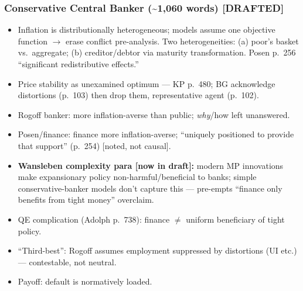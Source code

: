\documentclass[12pt,a4paper]{article}
\begin{document}
\begin{doublespace}
\subsubsection{Conservative Central Banker (\textasciitilde1,060 words) [DRAFTED]}
\begin{itemize}
    \item Inflation is distributionally heterogeneous; models assume one objective function $\rightarrow$ erase conflict pre-analysis. Two heterogeneities: (a) poor's basket vs.\ aggregate; (b) creditor/debtor via maturity transformation. Posen p.\ 256 ``significant redistributive effects.''
    \item Price stability as unexamined optimum --- KP p.\ 480; BG acknowledge distortions (p.\ 103) then drop them, representative agent (p.\ 102).
    \item Rogoff banker: more inflation-averse than public; \textit{why}/how left unanswered.
    \item Posen/finance: finance more inflation-averse; ``uniquely positioned to provide that support'' (p.\ 254) [noted, not causal].
    \item \textbf{Wansleben complexity para [now in draft]:} modern MP innovations make expansionary policy non-harmful/beneficial to banks; simple conservative-banker models don't capture this --- pre-empts ``finance only benefits from tight money'' overclaim.
    \item QE complication (Adolph p.\ 738): finance $\neq$ uniform beneficiary of tight policy.
    \item ``Third-best'': Rogoff assumes employment suppressed by distortions (UI etc.) --- contestable, not neutral.
    \item Payoff: default is normatively loaded.
\end{itemize}


\end{doublespace}
\end{document}
